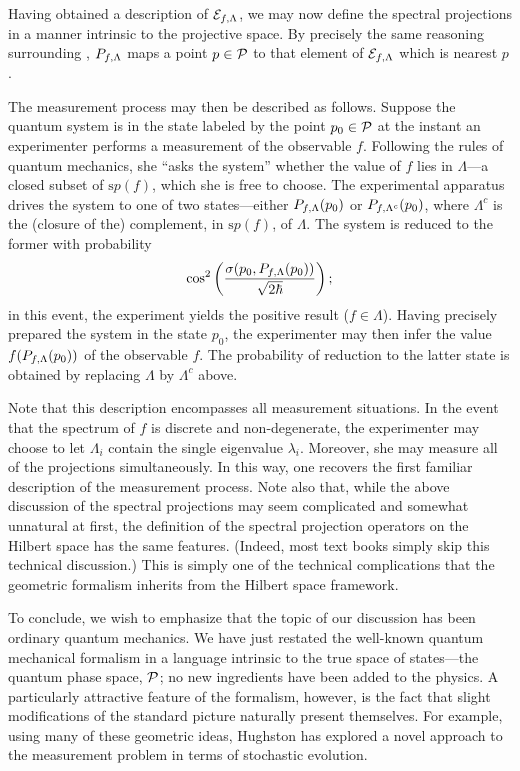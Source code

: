 Having obtained a description of ${\cal E}_{f, \Lambda}$, we may now
define the spectral projections in a manner intrinsic to the
projective space.  By precisely the same reasoning surrounding
, ${\Bbb P}_{f, \Lambda}$ maps a point $p\in\P$
to that element of ${\cal E}_{f, \Lambda}$ which is nearest $p$.

The measurement process may then be described as follows.  Suppose the
quantum system is in the state labeled by the point $p_0\in\P$ at the
instant an experimenter performs a measurement of the observable $f$.
Following the rules of quantum mechanics, she ``asks the system''
whether the value of $f$ lies in $\Lambda$---a closed subset of
${\mathrm sp}(f)$, which she is free to choose.  The experimental
apparatus drives the system to one of two states---either ${\Bbb
P}_{f, \Lambda}(p_0)$ or ${\Bbb P}_{f, \Lambda^c}(p_0)$, where
$\Lambda^c$ is the (closure of the) complement, in ${\mathrm sp}(f)$,
of $\Lambda$.  The system is reduced to the former with probability
%
\[
 \cos^2 \left(
 \frac{\sigma ( p_0, {\Bbb P}_{f, \Lambda}(p_0))}{\sqrt{2\hbar}}
 \right);
\]
%
in this event, the experiment yields the positive result
($f\in\Lambda$).  Having precisely prepared the system in the state
$p_0$, the experimenter may then infer the value $f({\Bbb P}_{f,
\Lambda}(p_0))$ of the observable $f$.  The probability of reduction
to the latter state is obtained by replacing $\Lambda$ by $\Lambda^c$
above.

Note that this description encompasses all measurement situations.  In
the event that the spectrum of $f$ is discrete and non-degenerate, the
experimenter may choose to let $\Lambda_i$ contain the single
eigenvalue $\lambda_i$.  Moreover, she may measure all of the
projections simultaneously.  In this way, one recovers the first
familiar description of the measurement process.  Note also that,
while the above discussion of the spectral projections may seem
complicated and somewhat unnatural at first, the definition of the
spectral projection operators on the Hilbert space has the same
features. (Indeed, most text books simply skip this technical
discussion.) This is simply one of the technical complications that
the geometric formalism inherits from the Hilbert space framework.

To conclude, we wish to emphasize that the topic of our discussion has
been ordinary quantum mechanics.  We have just restated the well-known
quantum mechanical formalism in a language intrinsic to the true space
of states---the quantum phase space, $\P$; no new ingredients have
been added to the physics.  A particularly attractive feature of the
formalism, however, is the fact that slight modifications of the
standard picture naturally present themselves.  For example, using
many of these geometric ideas, Hughston\cite{hughston2} has explored a
novel approach to the measurement problem in terms of stochastic
evolution.


